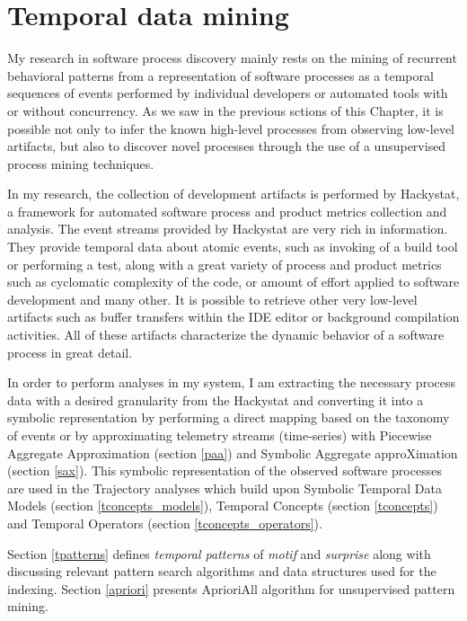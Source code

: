 \section{Temporal data mining} \label{methods}
My research in software process discovery mainly rests on the mining of recurrent behavioral patterns from a representation of software processes as a temporal sequences of events performed by individual developers or automated tools with or without concurrency. As we saw in the previous sctions of this Chapter, it is possible not only to infer the known high-level processes from observing low-level artifacts, but also to discover novel processes through the use of a unsupervised process mining techniques.

In my research, the collection of development artifacts is performed by Hackystat, a framework for automated software process and product metrics collection and analysis. The event streams provided by Hackystat are very rich in information. They provide temporal data about atomic events, such as invoking of a build tool or performing a test, along with a great variety of process and product metrics such as cyclomatic complexity of the code, or amount of effort applied to software development and many other. It is possible to retrieve other very low-level artifacts such as buffer transfers within the IDE editor or background compilation activities. All of these artifacts characterize the dynamic behavior of a software process in great detail.

In order to perform analyses in my system, I am extracting the necessary process data with a desired granularity from the Hackystat and converting it into a symbolic representation by performing a direct mapping based on the taxonomy of events or by approximating telemetry streams (time-series) with Piecewise Aggregate Approximation (section \ref{paa}) and Symbolic Aggregate approXimation (section \ref{sax}). This symbolic representation of the observed software processes are used in the Trajectory analyses which build upon Symbolic Temporal Data Models (section \ref{tconcepts_models}), Temporal Concepts (section \ref{tconcepts}) and Temporal Operators (section \ref{tconcepts_operators}). 

Section \ref{tpatterns} defines \textit{temporal patterns} of \textit{motif} and \textit{surprise} along with discussing relevant pattern search algorithms and data structures used for the indexing. Section \ref{apriori} presents AprioriAll algorithm for unsupervised pattern mining.